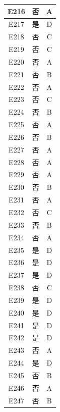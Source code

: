 \documentclass[UTF8]{ctexart}
\begin{document}
\begin{center}
\begin{longtable}{|c|c|c|}
		E216     & 否       & A        \\ \hline
		E217     & 是       & D        \\ \hline
		E218     & 否       & C        \\ \hline
		E219     & 否       & C        \\ \hline
		E220     & 否       & A        \\ \hline
		E221     & 否       & B        \\ \hline
		E222     & 否       & A        \\ \hline
		E223     & 否       & C        \\ \hline
		E224     & 否       & B        \\ \hline
		E225     & 否       & A        \\ \hline
		E226     & 否       & B        \\ \hline
		E227     & 否       & A        \\ \hline
		E228     & 否       & A        \\ \hline
		E229     & 否       & A        \\ \hline
		E230     & 否       & B        \\ \hline
		E231     & 否       & A        \\ \hline
		E232     & 否       & C        \\ \hline
		E233     & 否       & B        \\ \hline
		E234     & 否       & A        \\ \hline
		E235     & 是       & D        \\ \hline
		E236     & 是       & D        \\ \hline
		E237     & 是       & D        \\ \hline
		E238     & 否       & C        \\ \hline
		E239     & 是       & D        \\ \hline
		E240     & 是       & D        \\ \hline
		E241     & 是       & D        \\ \hline
		E242     & 是       & D        \\ \hline
		E243     & 否       & A        \\ \hline
		E244     & 是       & D        \\ \hline
		E245     & 否       & B        \\ \hline
		E246     & 否       & A        \\ \hline
		E247     & 否       & B        \\ \hline

\end{longtable}
\end{center}
\end{document}
